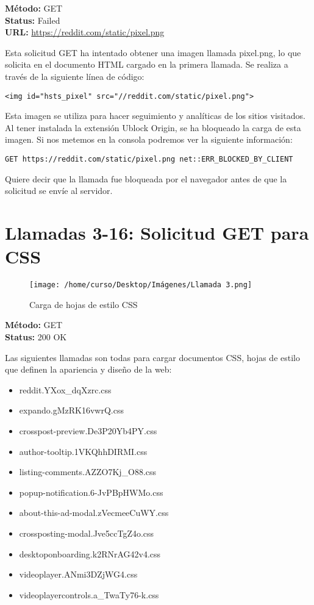 \documentclass[a4paper,12pt]{article}
\begin{document}
\textbf{Método:} GET \\
\textbf{Status:} Failed \\
\textbf{URL:} \url{https://reddit.com/static/pixel.png}

Esta solicitud GET ha intentado obtener una imagen llamada pixel.png, lo que solicita en el documento HTML cargado en la primera llamada. Se realiza a través de la siguiente línea de código: 

\verb|<img id="hsts_pixel" src="//reddit.com/static/pixel.png">|

Esta imagen se utiliza para hacer seguimiento y analíticas de los sitios visitados. Al tener instalada la extensión Ublock Origin, se ha bloqueado la carga de esta imagen. Si nos metemos en la consola podremos ver la siguiente información:

\begin{verbatim}
GET https://reddit.com/static/pixel.png net::ERR_BLOCKED_BY_CLIENT
\end{verbatim}

Quiere decir que la llamada fue bloqueada por el navegador antes de que la solicitud se envíe al servidor. 

\section*{Llamadas 3-16: Solicitud GET para CSS}

\begin{figure}[h!]
    \centering
    \texttt{[image: /home/curso/Desktop/Imágenes/Llamada 3.png]}
    \caption{Carga de hojas de estilo CSS}
\end{figure}

\textbf{Método:} GET \\
\textbf{Status:} 200 OK

Las siguientes llamadas son todas para cargar documentos CSS, hojas de estilo que definen la apariencia y diseño de la web:

\begin{itemize}
    \item reddit.YXox\_dqXzrc.css
    \item expando.gMzRK16vwrQ.css
    \item crosspost-preview.De3P20Yb4PY.css
    \item author-tooltip.1VKQhhDIRMI.css
    \item listing-comments.AZZO7Kj\_O88.css
    \item popup-notification.6-JvPBpHWMo.css
    \item about-this-ad-modal.zVecmeeCuWY.css
    \item crossposting-modal.Jve5ccTgZ4o.css
    \item desktoponboarding.k2RNrAG42v4.css
    \item videoplayer.ANmi3DZjWG4.css
    \item videoplayercontrols.a\_TwaTy76-k.css
\end{itemize}
\end{document}
